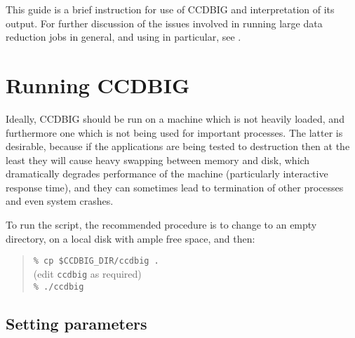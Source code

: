This guide is a brief instruction for use
of CCDBIG and interpretation of its output.
For further discussion of the issues involved in running large
data reduction jobs in general, and using {\CCDPref} in particular,
see .



\section{Running CCDBIG}

Ideally, CCDBIG should be run on a machine which is not
heavily loaded, and furthermore one which is not being used
for important processes.
The latter is desirable, because if the {\CCDPref} applications
are being tested to destruction then at the least they will
cause heavy swapping between memory and disk, which 
dramatically degrades performance of the machine 
(particularly interactive response time),
and they can sometimes lead to termination of other processes and
even system crashes.

To run the script, the recommended procedure is
to change to an empty directory, on a local disk with 
ample free space, and then:
\begin{quote}
\verb"% cp $CCDBIG_DIR/ccdbig ." \\
\hspace*{3em} (edit {\tt ccdbig} as required) \\
\verb"% ./ccdbig"
\end{quote}


\subsection{Setting parameters}
 \label{sec:parameters}

